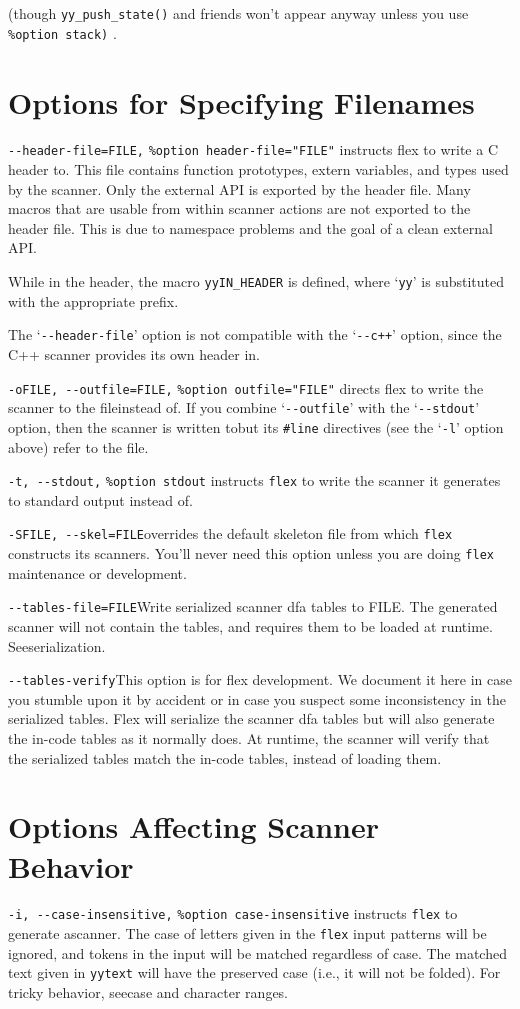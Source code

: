 \documentclass[openany,oneside]{book}
\begin{document}
(though \verb`yy_push_state()` and friends won't appear anyway unless
you use \verb`%option stack)` .
\section{Options for Specifying Filenames}
\verb`--header-file=FILE,` \verb`%option header-file="FILE"` instructs flex to write a C header to. This file contains
function prototypes, extern variables, and types used by the scanner. 
Only the external API is exported by the header file. Many macros that
are usable from within scanner actions are not exported to the header
file. This is due to namespace problems and the goal of a clean
external API.

While in the header, the macro \verb`yyIN_HEADER` is defined, where ‘\verb`yy`’
is substituted with the appropriate prefix.

The ‘\verb`--header-file`’ option is not compatible with the ‘\verb`--c++`’ option,
since the C++ scanner provides its own header in.

\verb`-oFILE, --outfile=FILE,` \verb`%option outfile="FILE"` directs flex to write the scanner to the fileinstead of.  If you combine ‘\verb`--outfile`’ with the ‘\verb`--stdout`’ option,
then the scanner is written tobut its \verb`#line` directives (see the ‘\verb`-l`’ option above) refer to the file.

\verb`-t, --stdout,` \verb`%option stdout` instructs \verb`flex` to write the scanner it generates to standard
output instead of.

\verb`-SFILE, --skel=FILE`overrides the default skeleton file from which \verb`flex` constructs its scanners.  You'll never need this option unless you are doing \verb`flex` maintenance or development.

\verb`--tables-file=FILE`Write serialized scanner dfa tables to FILE. The generated scanner will not
contain the tables, and requires them to be loaded at runtime. 
Seeserialization.

\verb`--tables-verify`This option is for flex development. We document it here in case you stumble
upon it by accident or in case you suspect some inconsistency in the serialized
tables.  Flex will serialize the scanner dfa tables but will also generate the
in-code tables as it normally does. At runtime, the scanner will verify that
the serialized tables match the in-code tables, instead of loading them.
\section{Options Affecting Scanner Behavior}
\verb`-i, --case-insensitive,` \verb`%option case-insensitive` instructs \verb`flex` to generate ascanner.  The
case of letters given in the \verb`flex` input patterns will be ignored,
and tokens in the input will be matched regardless of case.  The matched
text given in \verb`yytext` will have the preserved case (i.e., it will
not be folded).  For tricky behavior, seecase and character ranges.
\end{document}
